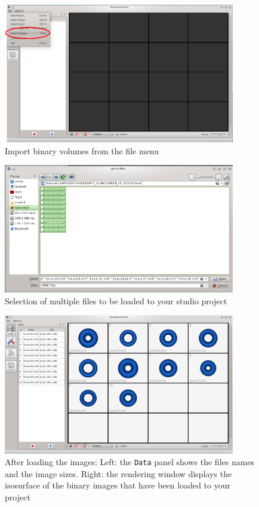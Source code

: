 \documentclass[letterpaper,12pt]{article}   %
\begin{document}
\begin{figure}[!htp]
\centering
\includegraphics[width=0.9\textwidth]{figs/import.png}
\caption{Import binary volumes from the file menu}
\label{fig:import}
\end{figure}

\begin{figure}[!htp]
\centering
\includegraphics[width=0.9\textwidth]{figs/torusfiles.png}
\caption{Selection of multiple files to be loaded to your studio project}
\label{fig:torusfiles}
\end{figure}

\begin{figure}[!htp]
\centering
\includegraphics[width=0.9\textwidth]{figs/torusimages.png}
\caption{After loading the images: Left: the \texttt{Data} panel shows the files names and the image sizes. Right: the rendering window displays the isosurface of the binary images that have been loaded to your project}
\label{fig:torusimages}
\end{figure}
\end{document}
